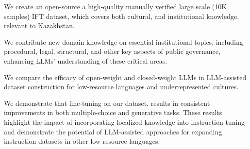 \begin{compactitem}
    
    \item We create an open-source a high-quality manually verified large scale (10K samples) IFT dataset, which covers both cultural, and institutional knowledge, relevant to Kazakhstan.
    \item We contribute new domain knowledge on essential institutional topics, including procedural, legal, structural, and other key aspects of public governance, enhancing LLMs' understanding of these critical areas.
    \item We compare the efficacy of open-weight and closed-weight LLMs in LLM-assisted dataset construction for low-resource languages and underrepresented cultures.
    \item We demonstrate that fine-tuning on our dataset, results in consistent improvements in both multiple-choice and generative tasks. These results highlight the impact of incorporating localized knowledge into instruction tuning and demonstrate the potential of LLM-assisted approaches for expanding instruction datasets in other low-resource languages.
\end{compactitem}




